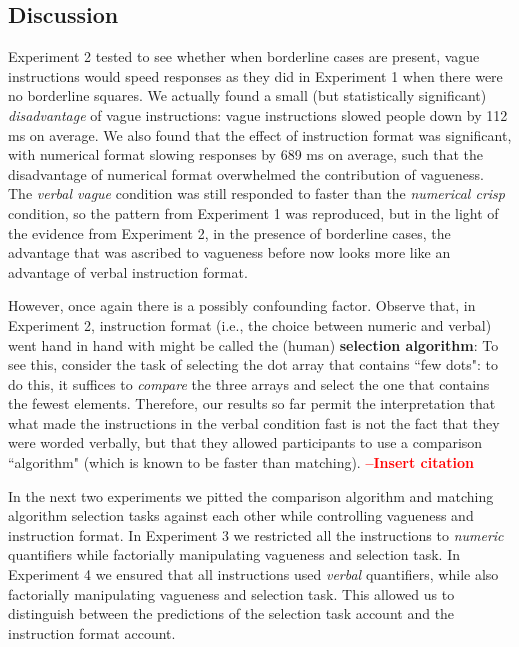 \documentclass[%
man,		%
floatsintext,%
apacite%
]{apa6}
\begin{document}
\subsection{Discussion} %

Experiment 2 tested to see whether when borderline cases are present, vague instructions would speed responses as they did in Experiment 1 when there were no borderline squares. 
We actually found a small (but statistically significant) \emph{disadvantage} of vague instructions: vague instructions slowed people down by 112 ms on average. We also found that the effect of instruction format was significant, with numerical format slowing responses by 689 ms on average, such that the disadvantage of numerical format overwhelmed the contribution of vagueness. The \emph{verbal vague} condition was still responded to faster than the \emph{numerical crisp} condition, so the pattern from Experiment 1 was reproduced, but in the light of the evidence from Experiment 2, in the presence of borderline cases, the advantage that was ascribed to vagueness before now looks more like an advantage of verbal instruction format.

However, once again there is a possibly confounding factor. Observe that, in Experiment 2, instruction format (i.e., the choice between numeric and verbal) went hand in hand with might be called the (human) {\bf selection algorithm}: To see this, consider the task of selecting the dot array that contains ``few dots": to do this, it suffices to {\em compare} the three arrays and select the one that contains the fewest elements. Therefore, our results so far permit the interpretation that what made the instructions in the verbal condition fast is not the fact that they were worded verbally, but that they allowed participants to use a comparison ``algorithm" (which is known to be faster than matching). %
\textcolor{red}{{\bf--Insert citation}}

In the next two experiments we pitted the comparison algorithm and matching algorithm selection tasks against each other while controlling vagueness and instruction format. In Experiment 3 we restricted all the instructions to \emph{numeric} quantifiers while factorially manipulating vagueness and selection task. In Experiment 4 we ensured that all instructions used \emph{verbal} quantifiers, while also factorially manipulating vagueness and selection task. This allowed us to distinguish between the predictions of the selection task account and the instruction format account. 
\end{document}
